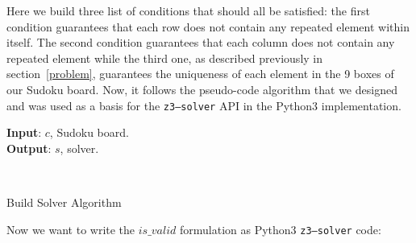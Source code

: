 \documentclass[]{usiinfprospectus}
\newcounter{row}
\newcounter{col}
\begin{document}
\noindent
Here we build three list of conditions that should all be satisfied: the first condition guarantees that each row does not contain any repeated element within itself. The second condition guarantees that each column does not contain any repeated element while the third one, as described previously
in section~\ref{problem}, guarantees the uniqueness of each element in the 9 boxes of our Sudoku board. Now, it follows the pseudo-code algorithm that we designed and was used as a basis for the \texttt{z3–solver} API in the Python3 implementation.
\begin{algorithm}[H]
\hspace*{\algorithmicindent} \textbf{Input}: $c$, Sudoku board. \\
\hspace*{\algorithmicindent} \textbf{Output}: $s$, solver. 
\begin{algorithmic}[1]\label{algorithm:}
 
\EndFor
{} 
\EndFor
{} 
\EndFor
\EndFor
{}
\\
\EndFunction
\end{algorithmic}
\caption {Build Solver Algorithm}
\end{algorithm}

\newpage
\noindent
Now we want to write the $ is\_valid $ formulation as Python3 \texttt{z3–solver}
code:
\end{document}
